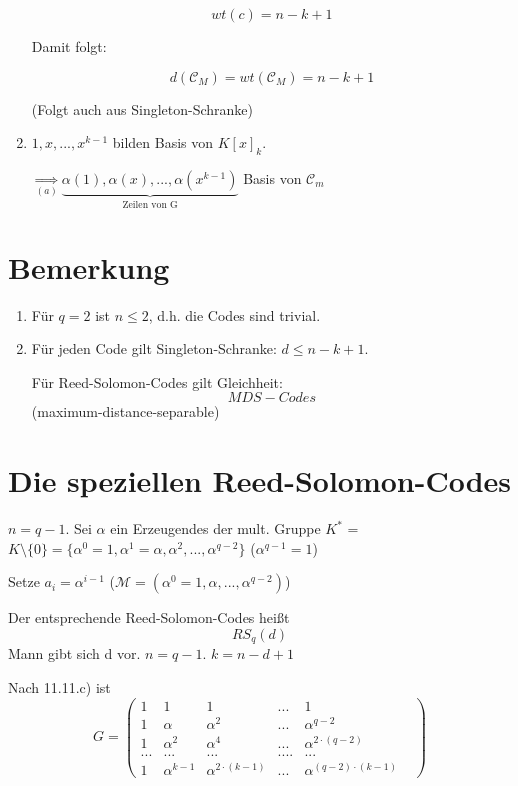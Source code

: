 \documentclass[a4paper, openany]{book}
\begin{document}
\begin{enumerate}[label=(\alph*)]
	\par \medskip

	\[ wt(c) = n-k+1 \]

	Damit folgt:

	\[ d(\mathcal{C}_M) = wt(\mathcal{C}_M) = n-k+1 \]

	(Folgt auch aus Singleton-Schranke)

	\item $1,x,...,x^{k-1}$ bilden Basis von $K[x]_k$.		

	\par \medskip

	$\underset{(a)}{\Rightarrow} \underbrace{\alpha(1), \alpha(x), ..., \alpha(x^{k-1})}_{\text{Zeilen von G}}$ Basis von $\mathcal{C}_m$
\end{enumerate}

\section{Bemerkung}

\begin{enumerate}[label=(\alph*)]
	\item Für $q=2$ ist $n \le 2$, d.h. die Codes sind trivial.
	\item Für jeden Code gilt Singleton-Schranke: $d \le n-k+1$. 

	Für Reed-Solomon-Codes gilt Gleichheit: \[ MDS-Codes \] (maximum-distance-separable)
\end{enumerate}

\section{Die speziellen Reed-Solomon-Codes}

$n = q-1$. Sei $\alpha$ ein Erzeugendes der mult. Gruppe $K^*$ = $K \setminus \{0\} = \{\alpha^0=1, \alpha^1 = \alpha, \alpha^2, ..., \alpha^{q-2}\}$ ($\alpha^{q-1} = 1$)

\par \medskip

Setze $a_i = \alpha^{i-1}$ ($\mathcal{M} = (\alpha^0 = 1, \alpha, ..., \alpha^{q-2})$)

Der entsprechende Reed-Solomon-Codes heißt \[ RS_q(d) \] Mann gibt sich d vor. $n = q -1$. $k = n-d+1$

Nach 11.11.c) ist \[ G = \begin{pmatrix}1 & 1 & 1 & ... & 1 \\ 1 & \alpha & \alpha^2 & ... & \alpha^{q-2} \\ 1 & \alpha^2 & \alpha^4 & ... & \alpha^{2 \cdot (q-2)} \\ ... & ... & ... & .... & ... & \\ 1 & \alpha^{k-1} & \alpha^{2 \cdot (k-1)} & ... & \alpha^{(q-2) \cdot (k-1)} \end{pmatrix} \]
\end{document}

